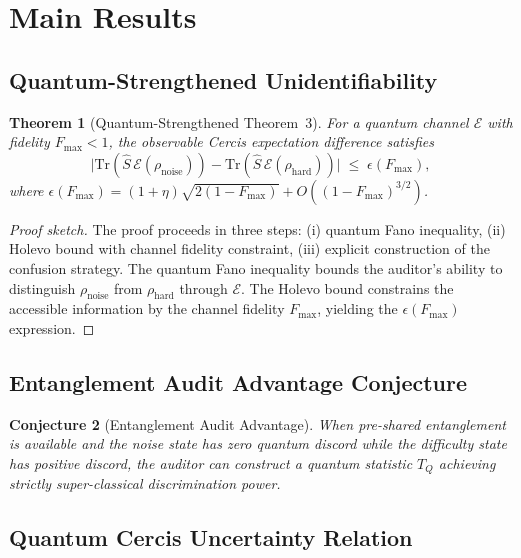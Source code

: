 \documentclass[12pt,a4paper]{article}
\newtheorem{theorem}{Theorem}[section]
\newtheorem{conjecture}[theorem]{Conjecture}
\newcommand{\cE}{\mathcal{E}}
\newcommand{\Tr}{\mathrm{Tr}}
\begin{document}
\section{Main Results}

\subsection{Quantum-Strengthened Unidentifiability}

\begin{theorem}[Quantum-Strengthened Theorem~3]
\label{thm:quantum-strong}
For a quantum channel $\cE$ with fidelity $F_{\max}<1$, the observable Cercis expectation difference satisfies
\begin{equation}\label{eq:quantum-barrier}
    \bigl|\Tr(\hat{S}\,\cE(\rho_{\mathrm{noise}})) - \Tr(\hat{S}\,\cE(\rho_{\mathrm{hard}}))\bigr|
    \;\leq\; \epsilon(F_{\max}),
\end{equation}
where $\epsilon(F_{\max}) = (1+\eta)\sqrt{2(1-F_{\max})} + O((1-F_{\max})^{3/2})$.
\end{theorem}

\begin{proof}[Proof sketch]
The proof proceeds in three steps: (i) quantum Fano inequality, (ii) Holevo bound with channel fidelity constraint, (iii) explicit construction of the confusion strategy. The quantum Fano inequality bounds the auditor's ability to distinguish $\rho_{\mathrm{noise}}$ from $\rho_{\mathrm{hard}}$ through $\cE$. The Holevo bound constrains the accessible information by the channel fidelity $F_{\max}$, yielding the $\epsilon(F_{\max})$ expression.
\end{proof}

\subsection{Entanglement Audit Advantage Conjecture}

\begin{conjecture}[Entanglement Audit Advantage]
\label{conj:entanglement}
When pre-shared entanglement is available and the noise state has zero quantum discord while the difficulty state has positive discord, the auditor can construct a quantum statistic $T_Q$ achieving strictly super-classical discrimination power.
\end{conjecture}

\subsection{Quantum Cercis Uncertainty Relation}
\end{document}
